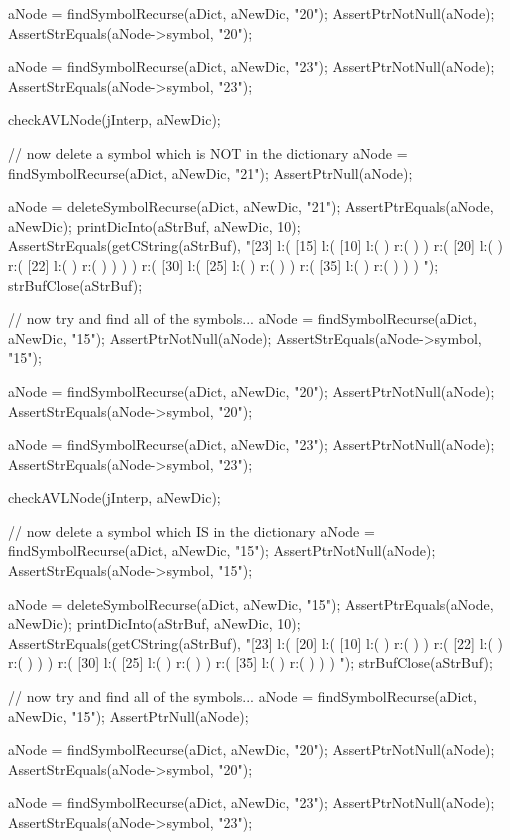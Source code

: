   aNode = findSymbolRecurse(aDict, aNewDic, "20");
  AssertPtrNotNull(aNode);
  AssertStrEquals(aNode->symbol, "20");

  aNode = findSymbolRecurse(aDict, aNewDic, "23");
  AssertPtrNotNull(aNode);
  AssertStrEquals(aNode->symbol, "23");

  checkAVLNode(jInterp, aNewDic);
  
  // now delete a symbol which is NOT in the dictionary
  aNode = findSymbolRecurse(aDict, aNewDic, "21");
  AssertPtrNull(aNode);
  
  aNode = deleteSymbolRecurse(aDict, aNewDic, "21");
  AssertPtrEquals(aNode, aNewDic);
  printDicInto(aStrBuf, aNewDic, 10);
  AssertStrEquals(getCString(aStrBuf),
  "[23] l:( [15] l:( [10] l:(  ) r:(  )  ) r:( [20] l:(  ) r:( [22] l:(  ) r:(  )  )  )  ) r:( [30] l:( [25] l:(  ) r:(  )  ) r:( [35] l:(  ) r:(  )  )  ) ");
  strBufClose(aStrBuf);

  // now try and find all of the symbols...
  aNode = findSymbolRecurse(aDict, aNewDic, "15");
  AssertPtrNotNull(aNode);
  AssertStrEquals(aNode->symbol, "15");

  aNode = findSymbolRecurse(aDict, aNewDic, "20");
  AssertPtrNotNull(aNode);
  AssertStrEquals(aNode->symbol, "20");

  aNode = findSymbolRecurse(aDict, aNewDic, "23");
  AssertPtrNotNull(aNode);
  AssertStrEquals(aNode->symbol, "23");

  checkAVLNode(jInterp, aNewDic);

  // now delete a symbol which IS in the dictionary
  aNode = findSymbolRecurse(aDict, aNewDic, "15");
  AssertPtrNotNull(aNode);
  AssertStrEquals(aNode->symbol, "15");
  
  aNode = deleteSymbolRecurse(aDict, aNewDic, "15");
  AssertPtrEquals(aNode, aNewDic);
  printDicInto(aStrBuf, aNewDic, 10);
  AssertStrEquals(getCString(aStrBuf),
  "[23] l:( [20] l:( [10] l:(  ) r:(  )  ) r:( [22] l:(  ) r:(  )  )  ) r:( [30] l:( [25] l:(  ) r:(  )  ) r:( [35] l:(  ) r:(  )  )  ) ");
  strBufClose(aStrBuf);

  // now try and find all of the symbols...
  aNode = findSymbolRecurse(aDict, aNewDic, "15");
  AssertPtrNull(aNode);

  aNode = findSymbolRecurse(aDict, aNewDic, "20");
  AssertPtrNotNull(aNode);
  AssertStrEquals(aNode->symbol, "20");

  aNode = findSymbolRecurse(aDict, aNewDic, "23");
  AssertPtrNotNull(aNode);
  AssertStrEquals(aNode->symbol, "23");


